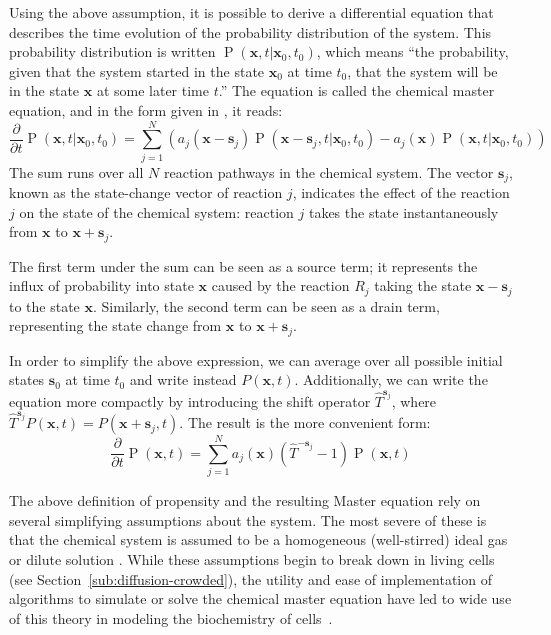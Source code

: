 \documentclass[english,letterpaper,12pt]{report}
\renewcommand{\vec}[1]{\ensuremath{\mathbf{#1}}}
\DeclareMathOperator{\Prob}{P}
\begin{document}
\begin{doublespacing}
Using the above assumption, it is possible to derive a differential equation that describes the time evolution of the probability distribution of the system. This probability distribution is written $\Prob(\vec{x}, t | \vec{x}_0, t_0)$, which means ``the probability, given that the system started in the state $\vec{x}_0$ at time $t_0$, that the system will be in the state $\vec{x}$ at some later time $t$.'' The equation is called the chemical master equation, and in the form given in \cite{gillespie-ssa}, it reads:
\begin{equation}
    \frac{\partial}{\partial t} \Prob(\vec{x}, t | \vec{x}_0, t_0) = \sum_{j=1}^N \left( a_j (\vec{x} - \vec{s}_j) \Prob(\vec{x} - \vec{s}_j, t | \vec{x}_0, t_0) - a_j(\vec{x}) \Prob(\vec{x}, t | \vec{x}_0, t_0) \right)
    \label{eq:master-eqn-gillespie}
\end{equation}
The sum runs over all $N$ reaction pathways in the chemical system. The vector $\vec{s}_j$, known as the state-change vector of reaction $j$, indicates the effect of the reaction $j$ on the state of the chemical system: reaction $j$ takes the state instantaneously from $\vec{x}$ to $\vec{x} + \vec{s}_j$.

The first term under the sum can be seen as a source term; it represents the influx of probability into state $\vec{x}$ caused by the reaction $R_j$ taking the state $\vec{x} - \vec{s}_j$ to the state $\vec{x}$. Similarly, the second term can be seen as a drain term, representing the state change from $\vec{x}$ to $\vec{x} + \vec{s}_j$.

In order to simplify the above expression, we can average over all possible initial states $\vec{s}_0$ at time $t_0$ and write instead $P(\vec{x}, t)$. Additionally, we can write the equation more compactly by introducing the shift operator $\hat{T}^{\vec{s}_j}$, where $\hat{T}^{\vec{s}_j} P(\vec{x}, t) = P(\vec{x} + \vec{s}_j, t)$. The result is the more convenient form:
\begin{equation}
    \frac{\partial}{\partial t} \Prob(\vec{x}, t) = \sum_{j=1}^N a_j(\vec{x})(\hat{T}^{-\vec{s}_j} - 1)\Prob(\vec{x}, t)
    \label{eq:master-eqn}
\end{equation}

The above definition of propensity and the resulting Master equation rely on several simplifying assumptions about the system. The most severe of these is that the chemical system is assumed to be a homogeneous (well-stirred) ideal gas or dilute solution \cite{langevin-limit}. While these assumptions begin to break down in living cells (see Section~\ref{sub:diffusion-crowded}), the utility and ease of implementation of algorithms to simulate or solve the chemical master equation have led to wide use of this theory in modeling the biochemistry of cells~\cite{we-chemkin}\cite{stoch-sys-bio}.


\end{doublespacing}
\end{document}
